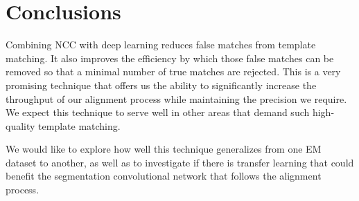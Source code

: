 \documentclass{article}
\begin{document}
\section{Conclusions}

Combining NCC with deep learning reduces false matches from template matching. It also improves the efficiency by which those false matches can be removed so that a minimal number of true matches are rejected. This is a very promising technique that offers us the ability to significantly increase the throughput of our alignment process while maintaining the precision we require. We expect this technique to serve well in other areas that demand such high-quality template matching.

We would like to explore how well this technique generalizes from one EM dataset to another, as well as to investigate if there is transfer learning that could benefit the segmentation convolutional network that follows the alignment process.










\medskip

\small




\newpage

  


  
  
  

  
\end{document}
